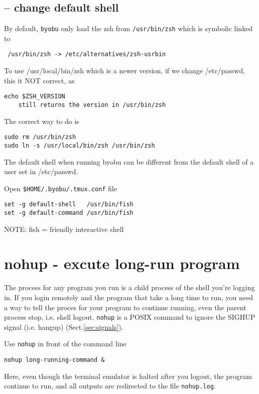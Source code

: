 \subsection{-- change default shell}


By default, \verb!byobu! only load the zsh from \verb!/usr/bin/zsh! which is symbolic linked to 
\begin{verbatim}
 /usr/bin/zsh -> /etc/alternatives/zsh-usrbin
\end{verbatim}

To use /usr/local/bin/zsh which is a newer version, if we change /etc/passwd, this it NOT correct, as 
\begin{verbatim}
echo $ZSH_VERSION
	still returns the version in /usr/bin/zsh
\end{verbatim}
The correct way to do is 
\begin{verbatim}
sudo rm /usr/bin/zsh
sudo ln -s /usr/local/bin/zsh /usr/bin/zsh
\end{verbatim}


The default shell when running byobu can be different from the default shell of a user set in 
/etc/passwd.

Open \verb~$HOME/.byobu/.tmux.conf~ file
\begin{verbatim}
set -g default-shell   /usr/bin/fish
set -g default-command /usr/bin/fish
\end{verbatim}
NOTE: fish = friendly interactive shell





\section{nohup - excute long-run program}
\label{sec:nohup}

The process for any program you run is a child process of the shell you're
logging in. If you login remotely and the program that take a long time to run,
you need a way to tell the proces for your program to continue running, even the
parent process stop, i.e. shell logout. \verb!nohup! is a POSIX command to
ignore the SIGHUP signal (i.e. hangup) (Sect.\ref{sec:signals}). 

Use \verb!nohup! in front of the command line
\begin{verbatim}
nohup long-running-command &
\end{verbatim}
Here, even though the terminal emulator is halted after you logout, the program
continue to run, and all outputs are redirected to the file \verb!nohup.log!.

